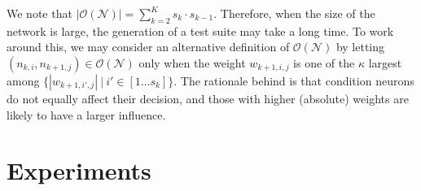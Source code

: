 \documentclass[runningheads,a4paper]{llncs}
\newcommand{\xiaowei}[1]{{\color{blue}#1}}
\newcommand{\youcheng}[1]{{\color{red}#1}}
\newcommand{\networks}{\mathcal{N}}
\newcommand{\neuronpairs}{\mathcal{O}}
\newcommand{\valuefunction}{g}
\newcommand{\distancefunction}{h}
\newcommand{\covered}[3]{cov_{#1}^{#2}#3}
\begin{document}
We note that $|\neuronpairs(\networks)|= \sum_{k=2}^{K} s_k \cdot s_{k-1}$. 
%
Therefore, when the size of the network is large, the generation of a test
suite may take a  long time.  To work around this, we may consider an
alternative definition of $\neuronpairs(\networks)$ by letting
$(n_{k,i},n_{k+1,j})\in \neuronpairs(\networks)$ only when the weight
$w_{k+1,i,j}$ is one of the $\kappa$ largest among $\{|w_{k+1,i',j}|~|~i'\in
[1\dots s_{k}]\}$.  The rationale behind is that condition neurons do not
equally affect their decision, and those with higher (absolute) weights are
likely to have a larger influence.

\section{Experiments}%
\end{document}
